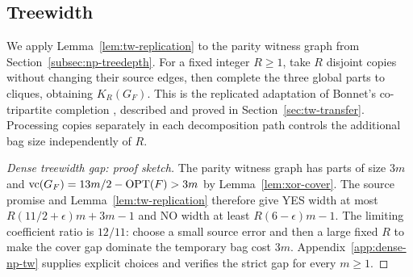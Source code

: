 \subsection{Treewidth}
\label{subsec:np-treewidth}

We apply Lemma~\ref{lem:tw-replication} to the parity witness graph
from Section~\ref{subsec:np-treedepth}. For a fixed integer $R\geq1$,
take $R$ disjoint copies without changing their source edges, then complete the three global
parts to cliques, obtaining $K_R(G_F)$. This is the replicated
adaptation of Bonnet's co-tripartite completion
\cite[Section~3.1]{BonnetTreewidth}, described and proved in
Section~\ref{sec:tw-transfer}. Processing copies separately in each
decomposition path controls the additional bag size independently of $R$.

\begin{proof}[Dense treewidth gap: proof sketch]
The parity witness graph has parts of size $3m$ and
$\operatorname{vc}(G_F)=13m/2-\operatorname{OPT}(F)>3m$ by Lemma~\ref{lem:xor-cover}.
The source promise and Lemma~\ref{lem:tw-replication} therefore
give YES width at most $R(11/2+\epsilon)m+3m-1$ and NO width at
least $R(6-\epsilon)m-1$. The limiting coefficient ratio is
$12/11$: choose a small source error and then a large fixed $R$
to make the cover gap dominate the temporary bag cost $3m$.
Appendix~\ref{app:dense-np-tw} supplies explicit choices and
verifies the strict gap for every $m\geq1$.
\end{proof}

